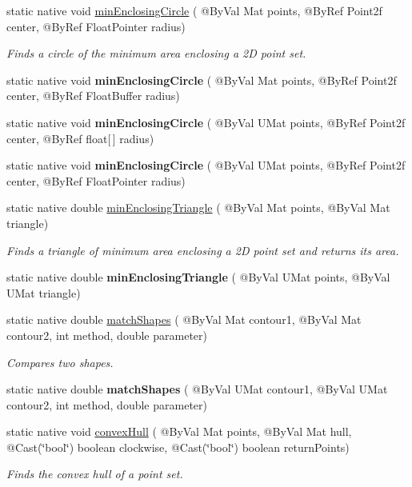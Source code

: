 \begin{DoxyCompactItemize}
\item 
static native void \hyperlink{group__imgproc__shape_ga6247e734952a578322d69260230c4a41}{min\+Enclosing\+Circle} ( @By\+Val Mat points, @By\+Ref Point2f center, @By\+Ref Float\+Pointer radius)
\begin{DoxyCompactList}\small\item\em Finds a circle of the minimum area enclosing a 2D point set. \end{DoxyCompactList}\item 
static native void {\bfseries min\+Enclosing\+Circle} ( @By\+Val Mat points, @By\+Ref Point2f center, @By\+Ref Float\+Buffer radius)
\item 
static native void {\bfseries min\+Enclosing\+Circle} ( @By\+Val U\+Mat points, @By\+Ref Point2f center, @By\+Ref float\mbox{[}$\,$\mbox{]} radius)
\item 
static native void {\bfseries min\+Enclosing\+Circle} ( @By\+Val U\+Mat points, @By\+Ref Point2f center, @By\+Ref Float\+Pointer radius)
\item 
static native double \hyperlink{group__imgproc__shape_ga789d0feac6b1ff1a2d13cfc58fa3e898}{min\+Enclosing\+Triangle} ( @By\+Val Mat points, @By\+Val Mat triangle)
\begin{DoxyCompactList}\small\item\em Finds a triangle of minimum area enclosing a 2D point set and returns its area. \end{DoxyCompactList}\item 
static native double {\bfseries min\+Enclosing\+Triangle} ( @By\+Val U\+Mat points, @By\+Val U\+Mat triangle)
\item 
static native double \hyperlink{group__imgproc__shape_gad14ba9809a9703bef3dbdcd1a487d2fb}{match\+Shapes} ( @By\+Val Mat contour1, @By\+Val Mat contour2, int method, double parameter)
\begin{DoxyCompactList}\small\item\em Compares two shapes. \end{DoxyCompactList}\item 
static native double {\bfseries match\+Shapes} ( @By\+Val U\+Mat contour1, @By\+Val U\+Mat contour2, int method, double parameter)
\item 
static native void \hyperlink{group__imgproc__shape_gad55038a508ccdb2a51346a9321039983}{convex\+Hull} ( @By\+Val Mat points, @By\+Val Mat hull, @Cast(\char`\"{}bool\char`\"{}) boolean clockwise, @Cast(\char`\"{}bool\char`\"{}) boolean return\+Points)
\begin{DoxyCompactList}\small\item\em Finds the convex hull of a point set. \end{DoxyCompactList}\item 

\end{DoxyCompactItemize}
